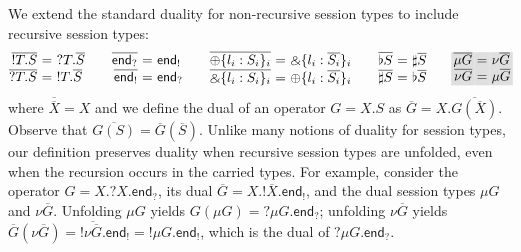 \documentclass[orivec,envcountsame]{llncs}
\makeatletter
\newcommand{\with}{\mathbin\binampersand}
\newcommand{\gvdual}[1]{\overline{#1}}
\newcommand{\gvout}[2]{{!#1.#2}}
\newcommand{\gvin}[2]{{?#1.#2}}
\newcommand{\outterm}{\mkwd{end}_!}
\newcommand{\interm}{\mkwd{end}_?}
\newcommand{\gvserver}[1]{\flat #1}
\newcommand{\gvservice}[1]{\sharp #1}
\newcommand{\mkwd}[1]{\mathsf{#1}}
\newcommand{\ba}{\begin{array}}
\newcommand{\ea}{\end{array}}
\newenvironment{eqs}{\ba{@{}r@{~}c@{~}l@{}}}{\ea}
\newcommand\shaderow{\noalign{\vskip-0.4pt}\rowcolor{shade}[0.6mm]}
\makeatother
\begin{document}
We extend the standard duality for non-recursive session types to include recursive session types:
\small\[
\ba{@{}c@{\qquad}c@{\qquad}c@{\qquad}c@{\qquad}c@{}}
\begin{eqs}
\gvdual{\gvout{T}{S}} &=& \gvin{T}{\gvdual{S}} \\
\gvdual{\gvin{T}{S}} &=& \gvout{T}{\gvdual{S}} \\
\end{eqs}
&
\begin{eqs}
  \gvdual{\interm} &=& \outterm \\
  \gvdual{\outterm} &=& \interm \\
\end{eqs}
&
\begin{eqs}
  \gvdual{\oplus \{ l_i: S_i \}_i} &=& \with \{ l_i : \gvdual{S_i} \}_i \\
  \gvdual{\with \{ l_i: S_i \}_i} &=& \oplus \{ l_i : \gvdual{S_i} \}_i \\
\end{eqs}
&
\begin{eqs}
  \gvdual{\gvserver{S}} &=& \gvservice{\gvdual{S}} \\
  \gvdual{\gvservice{S}} &=& \gvserver{\gvdual{S}} \\
\end{eqs}
&
\begin{eqs}
  \shaderow \gvdual{\mu G} &=& \nu \gvdual{G} \\
  \shaderow \gvdual{\nu G} &=& \mu \gvdual{G}
\end{eqs}
\ea
\]\normalsize
where $\gvdual{\gvdual{X}} = X$ and we define the dual of an operator $G = X.S$ as $\gvdual{G} =
X.\gvdual{G(\gvdual{X})}.$ Observe that $\gvdual{G(S)} = \gvdual{G}(\gvdual{S})$.  Unlike many
notions of duality for session types, our definition preserves duality when recursive session types
are unfolded, even when the recursion occurs in the carried types.  For example, consider the
operator $G = X.\gvin{X}{\interm}$, its dual $\gvdual{G} = X.\gvout{\gvdual{X}}{\outterm}$, and the
dual session types $\mu G$ and $\nu \gvdual{G}$. Unfolding $\mu G$ yields $G(\mu G) =
\gvin{\mu G}{\interm}$; unfolding $\nu \gvdual{G}$ yields
  $\gvdual{G}(\nu \gvdual{G}) = \gvout{\gvdual{\nu \gvdual{G}}}{\outterm} = \gvout{\mu G}{\outterm}$,
which is the dual of $\gvin{\mu G}{\interm}$.
\end{document}
